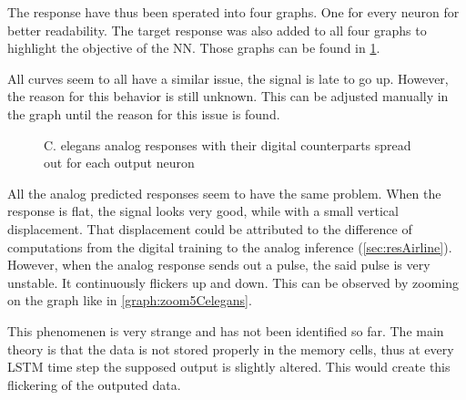 The response have thus been sperated into four graphs. One for every neuron for better readability. The target response was also added to all four graphs to highlight the objective of the \ac{NN}. Those graphs can be found in \cref{graph:spread5Celegans}.

All curves seem to all have a similar issue, the signal is late to go up. However, the reason for this behavior is still unknown. This can be adjusted manually in the graph until the reason for this issue is found.

\begin{figure}[H]
  \centering
  \begin{minipage}{\columnwidth}
    \hfill
  \end{minipage}
  \begin{minipage}{\columnwidth}
    \hfill
  \end{minipage}
  \caption{\ac{C. elegans} analog responses with their digital counterparts spread out for each output neuron}
  \label{graph:spread5Celegans}
\end{figure}

All the analog predicted responses seem to have the same problem. When the response is flat, the signal looks very good, while with a small vertical displacement. That displacement could be attributed to the difference of computations from the digital training to the analog inference (\cref{sec:resAirline}). However, when the analog response sends out a pulse, the said pulse is very unstable. It continuously flickers up and down. This can be observed by zooming on the graph like in \cref{graph:zoom5Celegans}.

This phenomenen is very strange and has not been identified so far. The main theory is that the data is not stored properly in the memory cells, thus at every \ac{LSTM} time step the supposed output is slightly altered. This would create this flickering of the outputed data.

